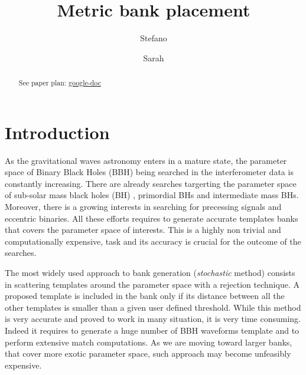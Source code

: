 \documentclass[twocolumn,showpacs,preprintnumbers,nofootinbib,prd,
superscriptaddress,10pt]{revtex4-1}
\begin{document}
\begin{abstract}
	See paper plan: \href{https://docs.google.com/document/d/1O8z0aDlXtV0LyrtK60vaQDzk9iiCsrjj1ThRGX1tX-0/edit}{google-doc}

\end{abstract}
	
	\title{Metric bank placement}
	\author{Stefano }
        
	\author{Sarah }
	\maketitle

	\tableofcontents

\section{Introduction}

As the gravitational waves astronomy enters in a mature state, the parameter space of Binary Black Holes (BBH) being searched in the interferometer data is constantly increasing. There are already searches targerting the parameter space of sub-solar mass black holes (BH) \cite{}, primordial BHs \cite{} and intermediate mass BHs. Moreover, there is a growing interests in searching for precessing signals and eccentric binaries.
All these efforts requires to generate accurate templates banks that covers the parameter space of interests. This is a highly non trivial and computationally expensive, task and its accuracy is crucial for the outcome of the searches.

The most widely used approach to bank generation ({\it stochastic} method) consists in scattering templates around the parameter space with a rejection technique. A proposed template is included in the bank only if its distance between all the other templates is smaller than a given user defined threshold. While this method is very accurate and proved to work in many situation, it is very time consuming. Indeed it requires to generate a huge number of BBH waveforms template and to perform extensive match computations.
As we are moving toward larger banks, that cover more exotic parameter space, such approach may become unfeasibly expensive.
\end{document}
